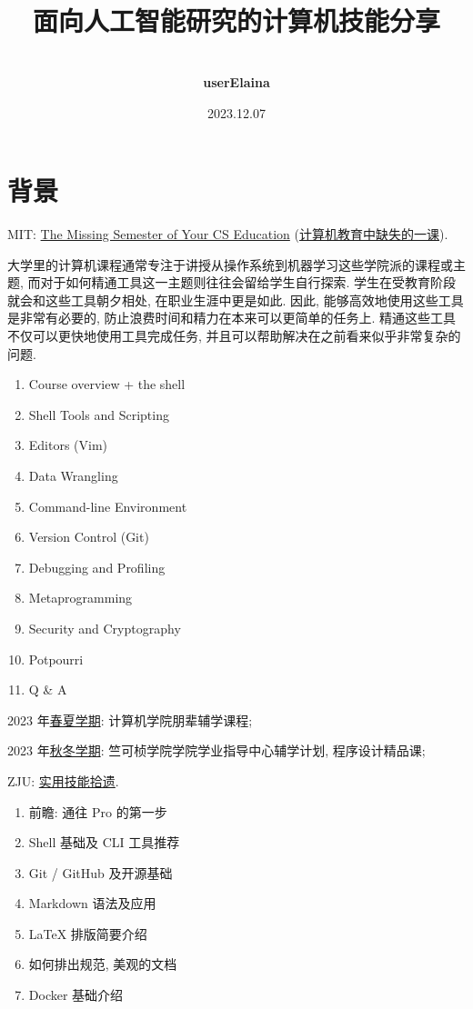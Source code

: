 \documentclass[a4paper]{article}
\title{
    \vspace*{1.0in}
     \\
    \vspace*{1in}
    \textbf{\Huge 面向人工智能研究的计算机技能分享}
    \vspace{0.5in}
}
\author{ \\
    \textbf{\huge userElaina} \\
    \vspace*{1in}
}
\date{\LARGE 2023.12.07}
\begin{document}
\LARGE

\maketitle
\tableofcontents
\thispagestyle{empty}
\newpage

\section{\LARGE 背景}

MIT: \href{https://missing.csail.mit.edu/}{The Missing Semester of Your CS Education} (\href{https://missing-semester-cn.github.io/}{计算机教育中缺失的一课}).

大学里的计算机课程通常专注于讲授从操作系统到机器学习这些学院派的课程或主题, 而对于如何精通工具这一主题则往往会留给学生自行探索. 学生在受教育阶段就会和这些工具朝夕相处, 在职业生涯中更是如此. 因此, 能够高效地使用这些工具是非常有必要的, 防止浪费时间和精力在本来可以更简单的任务上. 精通这些工具不仅可以更快地使用工具完成任务, 并且可以帮助解决在之前看来似乎非常复杂的问题.

\begin{enumerate}[leftmargin=2cm, itemindent=1cm]
    \item Course overview + the shell
    \item Shell Tools and Scripting
    \item Editors (Vim)
    \item Data Wrangling
    \item Command-line Environment
    \item Version Control (Git)
    \item Debugging and Profiling
    \item Metaprogramming
    \item Security and Cryptography
    \item Potpourri
    \item Q \& A
\end{enumerate}

2023 年\href{https://www.bilibili.com/video/BV1T84y1w7wB}{春夏学期}: 计算机学院朋辈辅学课程;

2023 年\href{https://www.bilibili.com/video/BV1t34y1g7YU}{秋冬学期}: 竺可桢学院学院学业指导中心辅学计划, 程序设计精品课;

ZJU: \href{https://slides.tonycrane.cc/PracticalSkillsTutorial/}{实用技能拾遗}.

\begin{enumerate}[leftmargin=2cm,  itemindent=1cm]
    \item 前瞻: 通往 Pro 的第一步
    \item Shell 基础及 CLI 工具推荐
    \item Git / GitHub 及开源基础
    \item Markdown 语法及应用
    \item LaTeX 排版简要介绍
    \item 如何排出规范,  美观的文档
    \item Docker 基础介绍
\end{enumerate}
\end{document}
